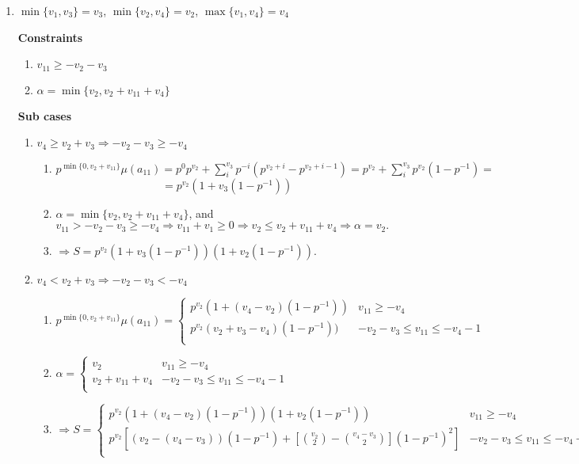 \documentclass{article}
\begin{document}
\begin{enumerate}
\begin{enumerate}
    \end{enumerate}
    \item $\min\{v_1,v_3\}=v_3$, $\min\{v_2,v_4\}=v_2$, $\max\{v_1,v_4\}=v_4$
    
    \textbf{Constraints}
    \begin{enumerate}
        \item $v_{11}\geq{-v_2-v_3}$
        \item $\alpha=\min\{v_2,v_2+v_{11}+v_4\}$
    \end{enumerate}
    
    \textbf{Sub cases}
    \begin{enumerate}
        \item $v_4\geq{v_2+v_3}\Rightarrow{-v_2-v_3\geq{-v_4}}$

        \begin{enumerate}
            \item $p^{\min\{0,v_2+v_{11}\}}\mu(a_{11})=p^{0}p^{v_2}+\sum_i^{v_3}p^{-i}(p^{v_2+i}-p^{v_2+i-1})=p^{v_2}+\sum_i^{v_3}p^{v_2}(1-p^{-1})=$\[=p^{v_2}(1+v_3(1-p^{-1}))\]
            \item $\alpha=\min\{v_2,v_2+v_{11}+v_4\}$, and $v_{11}>-v_2-v_3\geq{-v_4}\Rightarrow{v_{11}+v_1\geq{0}}\Rightarrow{v_2\leq{v_2+v_{11}+v_4}}\Rightarrow{\alpha=v_2}.$
            \item $\Rightarrow{S=p^{v_2}(1+v_3(1-p^{-1}))(1+v_2(1-p^{-1}))}.$
        \end{enumerate}

        \item $v_4<{v_2+v_3}\Rightarrow{-v_2-v_3<-v_4}$

        \begin{enumerate}
            \item $p^{\min\{0,v_2+v_{11}\}}\mu(a_{11})=
            \left\{
	\begin{array}{ll}
            p^{v_2}(1+(v_4-v_2)(1-p^{-1})) & v_{11}\geq{-v_4} \\
		  p^{v_2}(v_2+v_3-v_4)(1-p^{-1})) & -v_2-v_3\leq{v_{11}}\leq{-v_4-1} \\
	\end{array}
\right.
$
            \item $\alpha=\left\{
	\begin{array}{ll}
            v_2  & v_{11}\geq{-v_4} \\
		  v_2+v_{11}+v_4 & -v_2-v_3\leq{v_{11}}\leq{-v_4-1} \\
	\end{array}
\right.$
        \item $\Rightarrow{S=\left\{
	\begin{array}{ll}
            p^{v_2}(1+(v_4-v_2)(1-p^{-1}))(1+v_2(1-p^{-1}))  & v_{11}\geq{-v_4} \\
		              p^{v_2}[(v_2-(v_4-v_3))(1-p^{-1})+[\binom{v_2}{2}-\binom{v_4-v_3}{2}](1-p^{-1})^2]  & -v_2-v_3\leq{v_{11}}\leq{-v_4-1} \\
	\end{array}
\right.}.$
        \end{enumerate}


\end{enumerate}
\end{enumerate}
\end{document}
